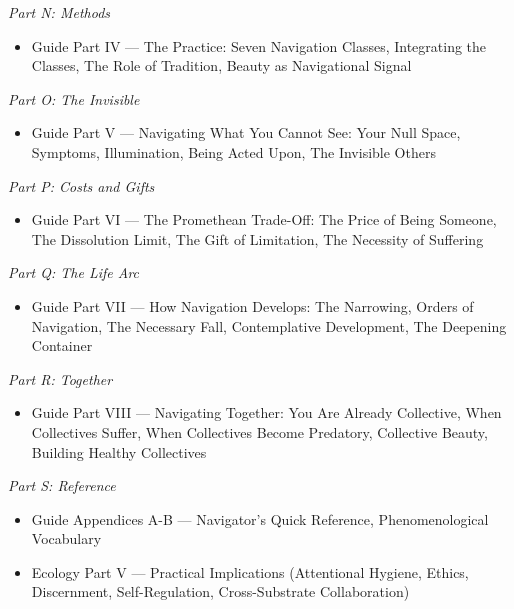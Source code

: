 \textit{Part N: Methods}

\begin{itemize}[nosep,leftmargin=*]
  \item Guide Part IV — The Practice: Seven Navigation Classes, Integrating the Classes, The Role of Tradition, Beauty as Navigational Signal
\end{itemize}


\textit{Part O: The Invisible}

\begin{itemize}[nosep,leftmargin=*]
  \item Guide Part V — Navigating What You Cannot See: Your Null Space, Symptoms, Illumination, Being Acted Upon, The Invisible Others
\end{itemize}


\textit{Part P: Costs and Gifts}

\begin{itemize}[nosep,leftmargin=*]
  \item Guide Part VI — The Promethean Trade-Off: The Price of Being Someone, The Dissolution Limit, The Gift of Limitation, The Necessity of Suffering
\end{itemize}


\textit{Part Q: The Life Arc}

\begin{itemize}[nosep,leftmargin=*]
  \item Guide Part VII — How Navigation Develops: The Narrowing, Orders of Navigation, The Necessary Fall, Contemplative Development, The Deepening Container
\end{itemize}


\textit{Part R: Together}

\begin{itemize}[nosep,leftmargin=*]
  \item Guide Part VIII — Navigating Together: You Are Already Collective, When Collectives Suffer, When Collectives Become Predatory, Collective Beauty, Building Healthy Collectives
\end{itemize}


\textit{Part S: Reference}

\begin{itemize}[nosep,leftmargin=*]
  \item Guide Appendices A-B — Navigator's Quick Reference, Phenomenological Vocabulary
  \item Ecology Part V — Practical Implications (Attentional Hygiene, Ethics, Discernment, Self-Regulation, Cross-Substrate Collaboration)
\end{itemize}


